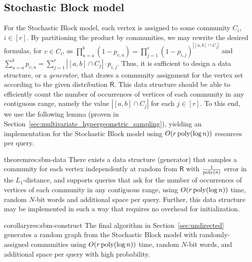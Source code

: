 \subsection{Stochastic Block model}
\label{sec:app_sbm}

For the Stochastic Block model, each vertex is assigned to some community $C_i$, $i \in [r]$.
By partitioning the product by communities, we may rewrite the desired formulas, for $v \in C_i$,
as $\prod_{u=a}^b (1-p_{v,u}) = \prod_{j=1}^r (1-p_{i,j})^{|[a,b]\cap C_j|}$ and $\sum_{u=a}^b p_{v,u}=\sum_{j=1}^r |[a,b]\cap C_j|\cdot p_{i,j}$.
Thus, it is sufficient to design a data structure, or a \emph{generator},
that draws a community assignment for the vertex set according to the given distribution $\mathsf{R}$.
This data structure should be able to efficiently count the number of occurrences of vertices of each community in any contiguous range,
namely the value $|[a,b]\cap C_j|$ for each $j \in [r]$.
To this end, we use the following lemma (proven in Section~\ref{sec:multivariate_hypergeometric_sampling}),
yielding an implementation for the Stochastic Block model using $O(r\, \mathrm{poly}(\log n))$ resources per query.

\begin{restatable}{theorem}{res:sbm-data}\label{thm:sbm-data}
There exists a data structure (generator) that samples a community for each vertex independently at random from $\mathsf{R}$
with $\frac{1}{\mathrm{poly}(n)}$ error in the $L_1$-distance, and supports queries that ask for the number of occurrences of vertices of each community
in any contiguous range, using $O(r\,\mathrm{poly}(\log n))$ time, random $N$-bit words and additional space per query.
Further, this data structure may be implemented in such a way that requires no overhead for initialization.
\end{restatable}
\begin{restatable}{corollary}{res:sbm-construct}\label{cor:sbm-construct}
The final algorithm in Section~\ref{sec:undirected} generates a random graph from the Stochastic Block model with randomly-assigned communities
using $O(r\,\mathrm{poly}(\log n))$ time, random $N$-bit words, and additional space per query with high probability.
\end{restatable}

